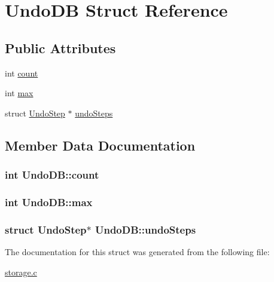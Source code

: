 \hypertarget{structUndoDB}{\section{Undo\-D\-B Struct Reference}
\label{structUndoDB}
}
\subsection*{Public Attributes}
\begin{DoxyCompactItemize}
\item 
int \hyperlink{structUndoDB_ac1fb881278ff7730b235e0723d3b050a}{count}
\item 
int \hyperlink{structUndoDB_a765a69b0a3bde1b2b0b73044757e9bb9}{max}
\item 
struct \hyperlink{structUndoStep}{Undo\-Step} $\ast$ \hyperlink{structUndoDB_a8477ec60e9ffc3a9bb5308ce860a66a7}{undo\-Steps}
\end{DoxyCompactItemize}


\subsection{Member Data Documentation}
\hypertarget{structUndoDB_ac1fb881278ff7730b235e0723d3b050a}{
\subsubsection[{count}]{\setlength{\rightskip}{0pt plus 5cm}int Undo\-D\-B\-::count}}\label{structUndoDB_ac1fb881278ff7730b235e0723d3b050a}
\hypertarget{structUndoDB_a765a69b0a3bde1b2b0b73044757e9bb9}{
\subsubsection[{max}]{\setlength{\rightskip}{0pt plus 5cm}int Undo\-D\-B\-::max}}\label{structUndoDB_a765a69b0a3bde1b2b0b73044757e9bb9}
\hypertarget{structUndoDB_a8477ec60e9ffc3a9bb5308ce860a66a7}{
\subsubsection[{undo\-Steps}]{\setlength{\rightskip}{0pt plus 5cm}struct {\bf Undo\-Step}$\ast$ Undo\-D\-B\-::undo\-Steps}}\label{structUndoDB_a8477ec60e9ffc3a9bb5308ce860a66a7}


The documentation for this struct was generated from the following file\-:\begin{DoxyCompactItemize}
\item 
\hyperlink{storage_8c}{storage.\-c}\end{DoxyCompactItemize}
